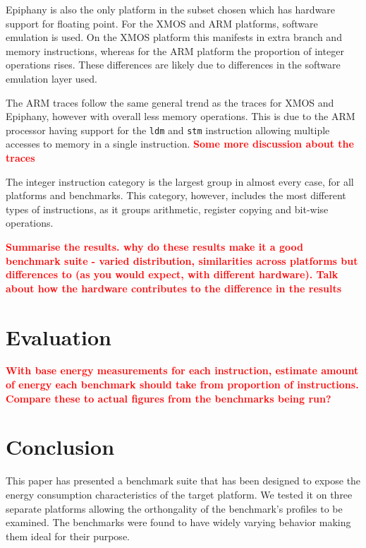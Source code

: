 \documentclass[twocolumn]{article}
\newcommand{\todo}[1]{\textbf{\textcolor{red}{#1}}}
\begin{document}
Epiphany is also the only platform in the subset chosen which has hardware support for floating point. For the XMOS and ARM platforms, software emulation is used. On the XMOS platform this manifests in extra branch and memory instructions, whereas for the ARM platform the proportion of integer operations rises. These differences are likely due to differences in the software emulation layer used.

The ARM traces follow the same general trend as the traces for XMOS and Epiphany, however with overall less memory operations. This is due to the ARM processor having support for the \texttt{ldm} and \texttt{stm} instruction allowing multiple accesses to memory in a single instruction.
\todo{Some more discussion about the traces}

The integer instruction category is the largest group in almost every case, for all platforms and benchmarks. This category, however, includes the most different types of instructions, as it groups arithmetic, register copying and bit-wise operations. 

\todo{Summarise the results. why do these results make it a good benchmark suite - varied distribution, similarities across platforms but differences to (as you would expect, with different hardware). Talk about how the hardware contributes to the difference in the results}

\section{Evaluation}

\todo{With base energy measurements for each instruction, estimate amount of energy each benchmark should take from proportion of instructions. Compare these to actual figures from the benchmarks being run?}

\section{Conclusion}

This paper has presented a benchmark suite that has been designed to expose the energy consumption characteristics of the target platform. We tested it on three separate platforms allowing the orthongality of the benchmark's profiles to be examined. The benchmarks were found to have widely varying behavior making them ideal for their purpose. \todo{}

\printbibliography
\end{document}
